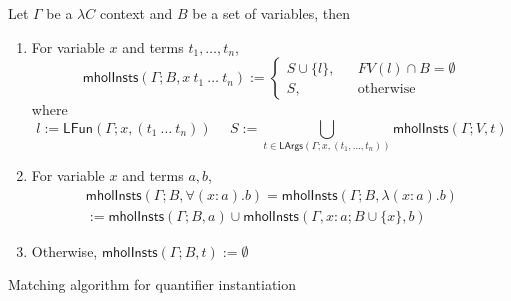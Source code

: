 \begin{definition}
  Let $\Gamma$ be a $\lambda C$ context and $B$ be a set of variables, then
  \begin{enumerate}
    \item For variable $x$ and terms $t_1, \dots, t_n$,
      $$\mathsf{mholInsts}(\Gamma; B, x \ t_1 \ \dots \ t_n) := \left\{
        \begin{aligned}
          S \cup \{l\}, & & FV(l) \cap B = \emptyset \\
          S, & & \text{otherwise}
        \end{aligned}
      \right.$$
      where
      $$l := \mathsf{LFun}(\Gamma; x, (t_1 \ \dots \ t_n)) \ \ \ \ \ \ S := \bigcup_{t \in \mathsf{LArgs}(\Gamma; x, (t_1, \dots, t_n))} \mathsf{mholInsts}(\Gamma; V, t)$$
    \item For variable $x$ and terms $a, b$,
      \begin{align*}
        \mathsf{mholInsts}(\Gamma; B, \forall (x : a). b) = \mathsf{mholInsts}(\Gamma; B, \lambda (x : a). b) 
        \\ := \mathsf{mholInsts}(\Gamma; B, a) \cup \mathsf{mholInsts}(\Gamma, x : a; B \cup \{x\}, b)
      \end{align*}
    \item Otherwise, $\mathsf{mholInsts}(\Gamma; B, t) := \emptyset$
  \end{enumerate}
\end{definition}

\begin{algorithm}\label{matching}
  \DontPrintSemicolon
  \SetNoFillComment
  \caption{Matching algorithm for quantifier instantiation}
\end{algorithm}

